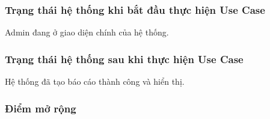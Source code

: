 \subsubsection{Trạng thái hệ thống khi bắt đầu thực hiện Use Case}
Admin đang ở giao diện chính của hệ thống.

\subsubsection{Trạng thái hệ thống sau khi thực hiện Use Case}
Hệ thống đã tạo báo cáo thành công và hiển thị.

\subsubsection{Điểm mở rộng}